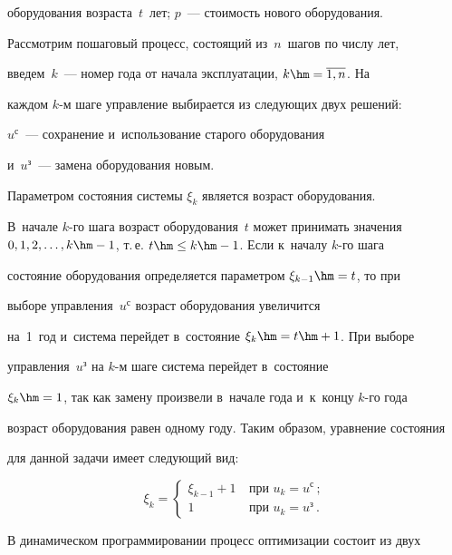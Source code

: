оборудования воз\-рас\-та~$t$~лет; $p$~--- сто\-и\-мость нового обору\-до\-ва\-ния. 


Рас\-смот\-рим пошаговый процесс, состоящий из~$n$~шагов по числу лет, 


введем~$k$~--- номер года от начала эксплуатации, $k\hm=\overline{1,n}$. На 


каждом $k$-м шаге управ\-ле\-ние выбирается из сле\-ду\-ющих двух решений: 


$u^{\mathrm{с}}$~--- сохранение и~использование старого оборудования 


и~$u^{\mathrm{з}}$~--- замена оборудования новым.


  


  Параметром состояния системы $\xi_k$ является воз\-раст оборудования. 


В~начале $k$-го шага воз\-раст оборудования~$t$ может принимать значения $0, 


1, 2, \ldots, k\hm- 1$, т.\,е. $t\hm\leq k\hm-1$. Если к~началу $k$-го шага 


со\-сто\-яние оборудования определяется параметром $\xi_{k-1}\hm = t$, то при 


выборе управ\-ле\-ния~$u^{\mathrm{с}}$ возраст оборудования увеличится 


на~1~год и~сис\-те\-ма перейдет в~со\-сто\-яние $\xi_k\hm = t \hm+ 1$. При выборе 


управления~$u^{\mathrm{з}}$ на $k$-м шаге система перейдет в~со\-сто\-яние 


$\xi_k\hm = 1$, так как замену произвели в~начале года и~к~концу $k$-го года 


воз\-раст оборудования равен одному году. Таким образом, урав\-не\-ние со\-сто\-яния 


для данной задачи имеет сле\-ду\-ющий вид:


  $$


  \xi_k=\begin{cases}


  \xi_{k-1}+1 &\ \mbox{при } u_k=u^{\mathrm{с}}\,;\\


  1 &\ \mbox{при } u_k=u^{\mathrm{з}}\,.


  \end{cases}


  $$


  


  В динамическом программировании процесс оптимизации состоит из двух 


